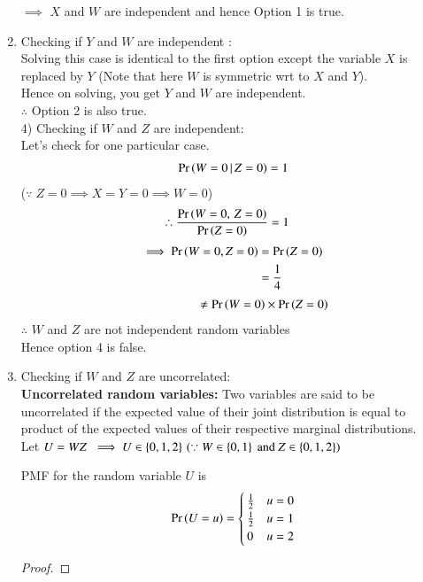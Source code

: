 \documentclass[journal,12pt,twocolumn]{IEEEtran}
\begin{document}
\begin{enumerate}
$\implies$ $X$ and $W$ are independent and hence Option 1 is true.
\item Checking if $Y$ and $W$ are independent :\\
Solving this case is identical to the first option except the variable $X$ is replaced by $Y$ (Note that here $W$ is symmetric wrt to $X$ and $Y$).\\
Hence on solving, you get $Y$  and $W$ are independent.\\
$\therefore$ Option 2 is also true.\\
4) Checking if $W$ and $Z$ are independent:\\
Let's check for one particular case.
\begin{align}
    \Pr\left(W=0\,|\,Z=0\right) = 1
\end{align}
($\because\;Z=0 \implies X = Y =0 \implies W=0$)
\begin{align}
    \therefore \frac{\Pr\left(W=0,\,Z=0\right)}{\Pr\left(Z=0\right)} &= 1
\end{align}
\begin{align}
 \implies\Pr\left(W=0,Z=0\right) &=\Pr\left(Z=0\right)\\ 
                      &= \frac{1}{4}
\end{align}
\begin{align}
\hspace{2cm}&\neq\Pr\left(W=0\right)\times\Pr\left(Z=0\right)   
\end{align}
$\therefore$ $W$ and $Z$ are not independent random variables\\
Hence option 4 is false.
\item Checking if $W$ and $Z$ are uncorrelated:\\
\textbf{Uncorrelated random variables:} Two variables are said to be uncorrelated if the expected value of their joint distribution is equal to product of the expected values of their respective marginal distributions.\\
Let $U=WZ\;\implies U\in\left\{0,1,2\right\}\,(\because W \in\left\{0,1\right\} \text{ and } Z \in\left\{0,1,2\right\})$
\begin{lemma}
PMF for the random variable $U$ is
 \begin{align}
    \Pr\left(U = u\right) = 
\begin{cases}
\frac{1}{2} & u=0
\\
\frac{1}{2} & u=1\\
0 & u=2
\end{cases}
\end{align}
\end{lemma}
\begin{proof}

\end{proof}
\end{enumerate}
\end{document}
